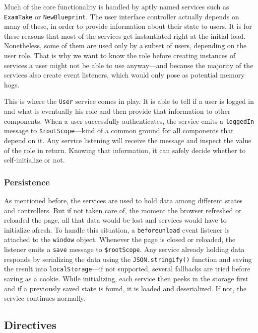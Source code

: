 \documentclass[thesis=M,english,hidelinks]{FITthesis}[2012/10/20]
\newcommand{\code}{\texttt}
\begin{document}
Much of the core functionality is handled by aptly named services such as \code{ExamTake} or \code{NewBlueprint}. The user interface controller actually depends on many of these, in order to provide information about their state to users. It is for these reasons that most of the services get instantiated right at the initial load. Nonetheless, some of them are used only by a subset of users, depending on the user role. That is why we want to know the role before creating instances of services a user might not be able to use anyway---and because the majority of the services also create event listeners, which would only pose as potential memory hogs.

This is where the \code{User} service comes in play. It is able to tell if a user is logged in and what is eventually his role and then provide that information to other components. When a user successfully authenticates, the service emits a \code{loggedIn} message to \code{\$rootScope}---kind of a common ground for all components that depend on it. Any service listening will receive the message and inspect the value of the role in return. Knowing that information, it can safely decide whether to self-initialize or not.

    \subsubsection{Persistence}

As mentioned before, the services are used to hold data among different states and controllers. But if not taken care of, the moment the browser refreshed or reloaded the page, all that data would be lost and services would have to initialize afresh. To handle this situation, a \code{beforeunload} event listener is attached to the \code{window} object. Whenever the page is closed or reloaded, the listener emits a \code{save} message to \code{\$rootScope}. Any service already holding data responds by serializing the data using the \code{JSON.stringify()} function and saving the result into \code{localStorage}---if not supported, several fallbacks are tried before saving as a cookie. While initializing, each service then peeks in the storage first and if a previously saved state is found, it is loaded and deserialized. If not, the service continues normally.

  \subsection{Directives}
\end{document}
